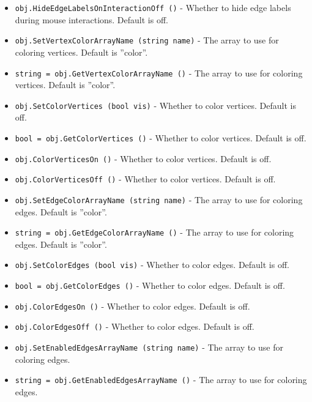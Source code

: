 \begin{itemize}
\item  \verb|obj.HideEdgeLabelsOnInteractionOff ()| -  Whether to hide edge labels during mouse interactions.  Default is off.

\item  \verb|obj.SetVertexColorArrayName (string name)| -  The array to use for coloring vertices.  Default is ''color''.

\item  \verb|string = obj.GetVertexColorArrayName ()| -  The array to use for coloring vertices.  Default is ''color''.

\item  \verb|obj.SetColorVertices (bool vis)| -  Whether to color vertices.  Default is off.

\item  \verb|bool = obj.GetColorVertices ()| -  Whether to color vertices.  Default is off.

\item  \verb|obj.ColorVerticesOn ()| -  Whether to color vertices.  Default is off.

\item  \verb|obj.ColorVerticesOff ()| -  Whether to color vertices.  Default is off.

\item  \verb|obj.SetEdgeColorArrayName (string name)| -  The array to use for coloring edges.  Default is ''color''.

\item  \verb|string = obj.GetEdgeColorArrayName ()| -  The array to use for coloring edges.  Default is ''color''.

\item  \verb|obj.SetColorEdges (bool vis)| -  Whether to color edges.  Default is off.

\item  \verb|bool = obj.GetColorEdges ()| -  Whether to color edges.  Default is off.

\item  \verb|obj.ColorEdgesOn ()| -  Whether to color edges.  Default is off.

\item  \verb|obj.ColorEdgesOff ()| -  Whether to color edges.  Default is off.

\item  \verb|obj.SetEnabledEdgesArrayName (string name)| -  The array to use for coloring edges.

\item  \verb|string = obj.GetEnabledEdgesArrayName ()| -  The array to use for coloring edges.


\end{itemize}
